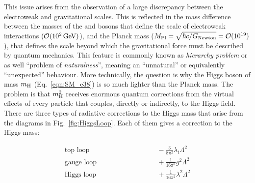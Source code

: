 This issue arises from the observation of a large discrepancy between the electroweak and gravitational scales. This is reflected in the mass difference between the masses of the \PW and \PZ bosons that define the scale of electroweak interactions ($\mathcal{O}(10^2\,\text{Ge\hspace{-.08em}V})$), and the Planck mass ($M_\mathrm{Pl} = \sqrt{\hbar c/G_\mathrm{Newton}} = \mathcal{O}(10^{19})$), that defines the scale beyond which the gravitational force must be described by quantum mechanics. This feature is commonly known as \textit{hierarchy problem} or as well ``problem of \textit{naturalness}'', meaning an ``unnatural'' or equivalently ``unexpected'' behaviour.
More technically, the question is why the Higgs boson of mass $m_\mathrm{H}$ (Eq.~\ref{eqn:SM_e38}) is so much lighter than the Planck mass.
The problem is that $m^2_\mathrm{H}$ receives enormous quantum corrections from the virtual effects of every particle that couples, directly or indirectly, to the Higgs field.
There are three types of radiative corrections to the Higgs mass that arise from the diagrams in Fig.~\ref{fig:HiggsLoop}.
Each of them gives a correction to the Higgs mass:

\begin{equation}\label{eqn:HiggsCorr}
\begin{aligned}
\mbox{top loop} & \qquad\qquad\qquad\qquad -\frac{3}{8\pi^2}\lambda_t\Lambda^2\\
\mbox{gauge loop} & \qquad\qquad\qquad\qquad + \frac{1}{16\pi^2}g^2\Lambda^2\\
\mbox{Higgs loop} & \qquad\qquad\qquad\qquad + \frac{1}{16\pi^2}\lambda^2\Lambda^2\\
\end{aligned}
\end{equation}

